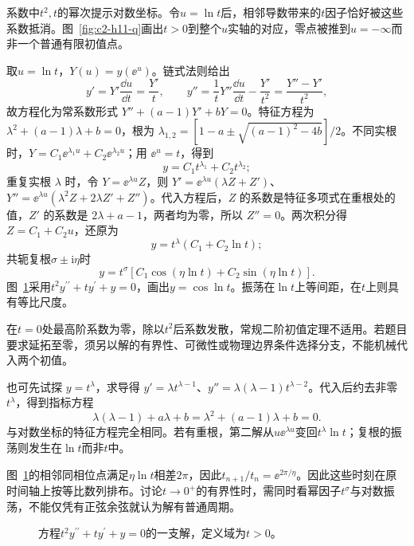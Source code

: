 \begin{solution}
系数中$t^2,t$的幂次提示对数坐标。令$u=\ln t$后，相邻导数带来的$t$因子恰好被这些系数抵消。图~\ref{fig:c2-h11-q}画出$t>0$到整个$u$实轴的对应，零点被推到$u=-\infty$而非一个普通有限初值点。


取$u=\ln t$，$Y(u)=y(\ee^u)$。链式法则给出
\[y'=Y'\frac{\dd u}{\dd t}=\frac{Y'}t,\qquad
y''=\frac1tY''\frac{\dd u}{\dd t}-\frac{Y'}{t^2}=\frac{Y''-Y'}{t^2},\]
故方程化为常系数形式 $Y''+(a-1)Y'+bY=0$。特征方程为 $\lambda^2+(a-1)\lambda+b=0$，根为 $\lambda_{1,2}=[1-a\pm\sqrt{(a-1)^2-4b}]/2$。不同实根时，$Y=C_1\ee^{\lambda_1u}+C_2\ee^{\lambda_2u}$；用 $\ee^u=t$，得到
\[y=C_1t^{\lambda_1}+C_2t^{\lambda_2};\]
重复实根 $\lambda$ 时，令 $Y=\ee^{\lambda u}Z$，则 $Y'=\ee^{\lambda u}(\lambda Z+Z')$、$Y''=\ee^{\lambda u}(\lambda^2Z+2\lambda Z'+Z'')$。代入方程后，$Z$ 的系数是特征多项式在重根处的值，$Z'$ 的系数是 $2\lambda+a-1$，两者均为零，所以 $Z''=0$。两次积分得 $Z=C_1+C_2u$，还原为
\[\boxed{y=t^\lambda(C_1+C_2\ln t)};\]
共轭复根$\sigma\pm\mathrm i\eta$时
\[y=t^\sigma[C_1\cos(\eta\ln t)+C_2\sin(\eta\ln t)].\]
图~\ref{fig:c2-h11-s}采用$t^2y^{\prime\prime}+ty^{\prime}+y=0$，画出$y=\cos\ln t$。振荡在$\ln t$上等间距，在$t$上则具有等比尺度。

在$t=0$处最高阶系数为零，除以$t^2$后系数发散，常规二阶初值定理不适用。若题目要求延拓至零，须另以解的有界性、可微性或物理边界条件选择分支，不能机械代入两个初值。


也可先试探 $y=t^\lambda$，求导得 $y'=\lambda t^{\lambda-1}$、$y''=\lambda(\lambda-1)t^{\lambda-2}$。代入后约去非零 $t^\lambda$，得到指标方程
\[\lambda(\lambda-1)+a\lambda+b=\lambda^2+(a-1)\lambda+b=0.\]
与对数坐标的特征方程完全相同。若有重根，第二解从$u\ee^{\lambda u}$变回$t^\lambda\ln t$；复根的振荡则发生在$\ln t$而非$t$中。

图~\ref{fig:c2-h11-s}的相邻同相位点满足$\eta\ln t$相差$2\pi$，因此$t_{n+1}/t_n=\ee^{2\pi/\eta}$。因此这些时刻在原时间轴上按等比数列排布。讨论$t\to0^+$的有界性时，需同时看幂因子$t^\sigma$与对数振荡，不能仅凭有正弦余弦就认为解有普通周期。

\begin{figure}[H]\centering
{}
\caption{方程$t^2y^{\prime\prime}+ty^\prime+y=0$的一支解，定义域为$t>0$。}\label{fig:c2-h11-s}
\end{figure}
\end{solution}


